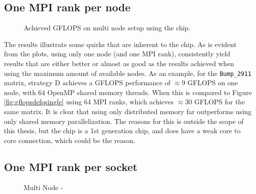 \subsection{One MPI rank per node}
\begin{figure}[H]
    \centering
    \caption{Achieved GFLOPS on multi node setup using the  chip.}
    \label{fig:gflopsdefqmulti}
\end{figure}
\medskip

The results illustrate some quirks that are inherent to the  chip. As is evident from the plots, using only one node (and one MPI rank), consistently yield results that are either better or almost as good as the results achieved when using the maximum amount of available nodes. As an example, for the \texttt{Bump\_2911} matrix, strategy D achieves a GFLOPS performance of \(\approx 9\) GFLOPS on one node, with 64 OpenMP shared memory threads. When this is compared to Figure \ref{fig:gflopsdefqsingle} using 64 MPI ranks, which achieves \(\approx 30\) GFLOPS for the same matrix. It is clear that using only distributed memory far outperforms using only shared memory parallelization. The reasons for this is outside the scope of this thesis, but the  chip is a 1st generation chip, and does have a weak core to core connection, which could be the reason. 
\medskip

\begin{figure}[H]
    \centering
    \caption{}
    \label{fig:tcommdefqmulti}
\end{figure}


\begin{figure}[H]
    \centering
    \caption{}
    \label{}
\end{figure}

\subsection{One MPI rank per socket}

\begin{figure}[H]
    \centering
    \caption{Multi Node - }
    \label{fig:gflopsdefqmpimulti}
\end{figure}

\begin{figure}[H]
    \centering
    \caption{}
    \label{fig:tcommdefqmpimulti}
\end{figure}


\begin{figure}[H]
    \centering
    \caption{}
    \label{}
\end{figure}
